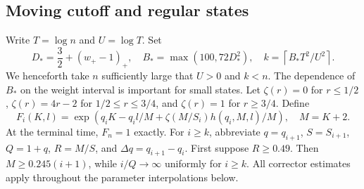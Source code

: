 \documentclass[11pt,a4paper]{article}
\theoremstyle{remark}\newtheorem{remark}[theorem]{Remark}
\numberwithin{equation}{section}
\begin{document}
\subsection{Moving cutoff and regular states}
Write $T=\log n$ and $U=\log T$. Set
\begin{equation}\label{wasc:lv:eq:uppercutoff}
D_*=\frac32+(w_+-1)_+,\quad B_* =\max(100,72D_*^2),\quad
k=\left\lceil B_*T^2/U^2\right\rceil.
\end{equation}
We henceforth take $n$ sufficiently large that $U>0$ and $k<n$. The dependence of $B_*$ on the weight interval is important for small states.
Let $\zeta(r)=0$ for $r\le1/2$, $\zeta(r)=4r-2$ for $1/2\le r\le3/4$, and $\zeta(r)=1$ for $r\ge3/4$. Define
\begin{equation}\label{wasc:lv:eq:upperpotential}
F_i(K,l)=\exp\left(q_iK-q_i l/M+\zeta(M/S_i)h(q_i,M,l)/M\right),
\quad M=K+2.
\end{equation}
At the terminal time, $F_n=1$ exactly. For $i\ge k$, abbreviate $q=q_{i+1}$, $S=S_{i+1}$, $Q=1+q$, $R=M/S$, and $\Delta q=q_{i+1}-q_i$.
First suppose $R\ge0.49$. Then $M\ge0.245(i+1)$, while $i/Q\to\infty$ uniformly for $i\ge k$. All corrector estimates apply throughout the parameter interpolations below.
\end{document}

